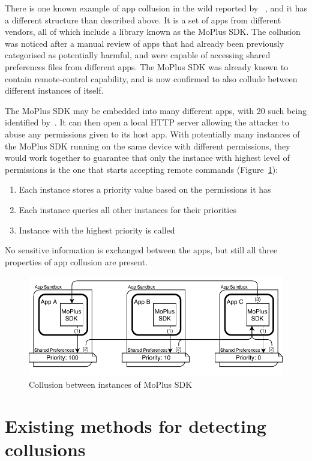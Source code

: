 \documentclass[article]{aaltoseries}
\newcommand{\Fref}[1]{Figure~\ref{#1}}
\begin{document}
There is one known example of app collusion in the wild reported by \citeauthor{Blasco2016}~\cite{Blasco2016}, and it has a different structure than described above. It is a set of apps from different vendors, all of which include a library known as the MoPlus SDK. The collusion was noticed after a manual review of apps that had already been previously categorised as potentially harmful, and were capable of accessing shared preferences files from different apps. The MoPlus SDK was already known to contain remote-control capability, and is now confirmed to also collude between different instances of itself.

The MoPlus SDK may be embedded into many different apps, with 20 such being identified by~\cite{Blasco2016}. It can then open a local HTTP server allowing the attacker to abuse any permissions given to its host app. With potentially many instances of the MoPlus SDK running on the same device with different permissions, they would work together to guarantee that only the instance with highest level of permissions is the one that starts accepting remote commands (\Fref{fig:moplus}):
\begin{enumerate}[nosep,label={(\arabic*)}]
	\item Each instance stores a priority value based on the permissions it has
	\item Each instance queries all other instances for their priorities
	\item Instance with the highest priority is called
\end{enumerate}
No sensitive information is exchanged between the apps, but still all three properties of app collusion are present.

\begin{figure}[t]
	\centering
	\includegraphics[width=1.0\textwidth]{figures/Collusion2}
	\caption{Collusion between instances of MoPlus SDK~\cite{Blasco2016}}
	\label{fig:moplus}
\end{figure}

\section{Existing methods for detecting collusions}
\label{sec:approaches}
\end{document}
